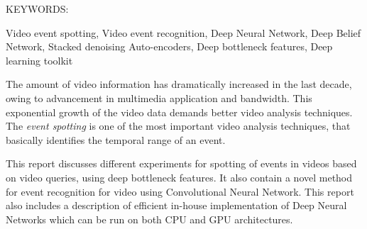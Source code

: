\abstract

\noindent KEYWORDS: \hspace*{0.5em} \parbox[t]{4.4in}{Video event spotting, Video event recognition, Deep Neural Network, Deep Belief Network, Stacked denoising Auto-encoders, Deep bottleneck features, Deep learning toolkit }

\vspace*{24pt}

The amount of video information has dramatically increased in the last decade, owing to advancement in multimedia application and bandwidth.  This exponential growth of the video data demands better video analysis techniques.  The \textit{event spotting} is one of the most important video analysis techniques, that basically identifies the temporal range of an event.

This report discusses different experiments for spotting of events in videos based on video queries, using deep bottleneck features.  It also contain a novel method for event recognition for video using Convolutional Neural Network.  This report also includes a description of efficient in-house implementation of Deep Neural Networks which can be run on both CPU and GPU architectures.
\pagebreak